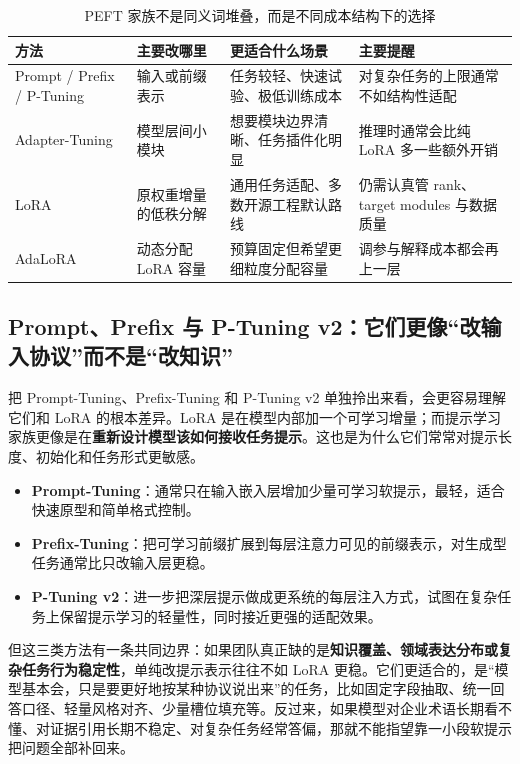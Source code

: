 \begin{table}[H]
\centering
\small
\begin{tabularx}{\textwidth}{>{\raggedright\arraybackslash}p{2.8cm}>{\raggedright\arraybackslash}p{2.8cm}>{\raggedright\arraybackslash}p{2.8cm}>{\raggedright\arraybackslash}X}
\toprule
\textbf{方法} & \textbf{主要改哪里} & \textbf{更适合什么场景} & \textbf{主要提醒} \\
\midrule
Prompt / Prefix / P-Tuning & 输入或前缀表示 & 任务较轻、快速试验、极低训练成本 & 对复杂任务的上限通常不如结构性适配 \\
Adapter-Tuning & 模型层间小模块 & 想要模块边界清晰、任务插件化明显 & 推理时通常会比纯 LoRA 多一些额外开销 \\
LoRA & 原权重增量的低秩分解 & 通用任务适配、多数开源工程默认路线 & 仍需认真管 rank、target modules 与数据质量 \\
AdaLoRA & 动态分配 LoRA 容量 & 预算固定但希望更细粒度分配容量 & 调参与解释成本都会再上一层 \\
\bottomrule
\end{tabularx}
\caption{PEFT 家族不是同义词堆叠，而是不同成本结构下的选择}
\label{tab:peft-family-choice}
\end{table}

\subsection{Prompt、Prefix 与 P-Tuning v2：它们更像“改输入协议”而不是“改知识”}
把 Prompt-Tuning、Prefix-Tuning 和 P-Tuning v2 单独拎出来看，会更容易理解它们和 LoRA 的根本差异。LoRA 是在模型内部加一个可学习增量；而提示学习家族更像是在\textbf{重新设计模型该如何接收任务提示}。这也是为什么它们常常对提示长度、初始化和任务形式更敏感。

\begin{itemize}
  \item \textbf{Prompt-Tuning}：通常只在输入嵌入层增加少量可学习软提示，最轻，适合快速原型和简单格式控制。
  \item \textbf{Prefix-Tuning}：把可学习前缀扩展到每层注意力可见的前缀表示，对生成型任务通常比只改输入层更稳。
  \item \textbf{P-Tuning v2}：进一步把深层提示做成更系统的每层注入方式，试图在复杂任务上保留提示学习的轻量性，同时接近更强的适配效果。
\end{itemize}

但这三类方法有一条共同边界：如果团队真正缺的是\textbf{知识覆盖、领域表达分布或复杂任务行为稳定性}，单纯改提示表示往往不如 LoRA 更稳。它们更适合的，是“模型基本会，只是要更好地按某种协议说出来”的任务，比如固定字段抽取、统一回答口径、轻量风格对齐、少量槽位填充等。反过来，如果模型对企业术语长期看不懂、对证据引用长期不稳定、对复杂任务经常答偏，那就不能指望靠一小段软提示把问题全部补回来。

